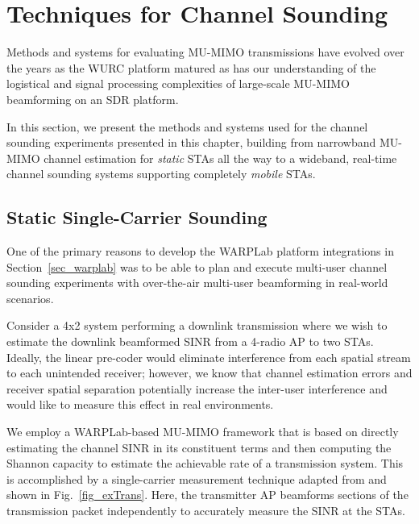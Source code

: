 \section{Techniques for Channel Sounding}
\label{sec_sounding_techniques}

Methods and systems for evaluating \ac{MU-MIMO} transmissions have evolved over the years as the \ac{WURC} platform matured as has our understanding of the logistical and signal processing complexities of large-scale \ac{MU-MIMO} beamforming on an \ac{SDR} platform.

In this section, we present the methods and systems used for the channel sounding experiments presented in this chapter, building from narrowband \ac{MU-MIMO} channel estimation for \textit{static} \acp{STA} all the way to a wideband, real-time channel sounding systems supporting completely \textit{mobile} \acp{STA}.



\subsection{Static Single-Carrier Sounding}
\label{sec_static_miso_mubf}

	One of the primary reasons to develop the WARPLab platform integrations in Section~\ref{sec_warplab} was to be able to plan and execute multi-user channel sounding experiments with over-the-air multi-user beamforming in real-world scenarios.
	
	Consider a 4x2 system performing a downlink transmission where we wish to estimate the downlink beamformed \ac{SINR} from a 4-radio \ac{AP} to two \acp{STA}.
	Ideally, the linear pre-coder would eliminate interference from each spatial stream to each unintended receiver; however, we know that channel estimation errors and receiver spatial separation potentially increase the inter-user interference and would like to measure this effect in real environments.
	
	We employ a WARPLab-based MU-MIMO framework that is based on directly estimating the channel \ac{SINR} in its constituent terms and then computing the Shannon capacity to estimate the achievable rate of a transmission system.
	This is accomplished by a single-carrier measurement technique adapted from \cite{aryafar2010design} and shown in Fig.~\ref{fig_exTrans}.
	Here, the transmitter \ac{AP} beamforms sections of the transmission packet independently to accurately measure the SINR at the \acp{STA}.

